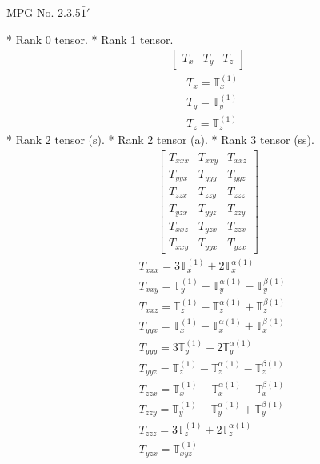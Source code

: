 \documentclass[fleqn,8pt,landscape]{jsarticle}
\begin{document}
\setcounter{MaxMatrixCols}{32}

\renewcommand{\tablename}{Table~}
\renewcommand{\figurename}{Figure~}
\begin{center}
\LARGE
MPG No. 2.3.5\quad$\bar{1}'$
\end{center}
* Rank 0 tensor.
* Rank 1 tensor.
\begin{align*}
\begin{bmatrix} T_{x} & T_{y} & T_{z} \end{bmatrix}
\end{align*}
\begin{align*}
& T_{x} = \mathbb{T}_{x}^{(1)} \\
& T_{y} = \mathbb{T}_{y}^{(1)} \\
& T_{z} = \mathbb{T}_{z}^{(1)}
\end{align*}
* Rank 2 tensor (s).
* Rank 2 tensor (a).
* Rank 3 tensor (ss).
\begin{align*}
\begin{bmatrix} T_{xxx} & T_{xxy} & T_{xxz} \\ T_{yyx} & T_{yyy} & T_{yyz} \\ T_{zzx} & T_{zzy} & T_{zzz} \\ T_{yzx} & T_{yyz} & T_{zzy} \\ T_{xxz} & T_{yzx} & T_{zzx} \\ T_{xxy} & T_{yyx} & T_{yzx} \end{bmatrix}
\end{align*}
\begin{align*}
& T_{xxx} = 3 \mathbb{T}_{x}^{(1)} + 2 \mathbb{T}_{x}^{\alpha(1)} \\
& T_{xxy} = \mathbb{T}_{y}^{(1)} - \mathbb{T}_{y}^{\alpha(1)} - \mathbb{T}_{y}^{\beta(1)} \\
& T_{xxz} = \mathbb{T}_{z}^{(1)} - \mathbb{T}_{z}^{\alpha(1)} + \mathbb{T}_{z}^{\beta(1)} \\
& T_{yyx} = \mathbb{T}_{x}^{(1)} - \mathbb{T}_{x}^{\alpha(1)} + \mathbb{T}_{x}^{\beta(1)} \\
& T_{yyy} = 3 \mathbb{T}_{y}^{(1)} + 2 \mathbb{T}_{y}^{\alpha(1)} \\
& T_{yyz} = \mathbb{T}_{z}^{(1)} - \mathbb{T}_{z}^{\alpha(1)} - \mathbb{T}_{z}^{\beta(1)} \\
& T_{zzx} = \mathbb{T}_{x}^{(1)} - \mathbb{T}_{x}^{\alpha(1)} - \mathbb{T}_{x}^{\beta(1)} \\
& T_{zzy} = \mathbb{T}_{y}^{(1)} - \mathbb{T}_{y}^{\alpha(1)} + \mathbb{T}_{y}^{\beta(1)} \\
& T_{zzz} = 3 \mathbb{T}_{z}^{(1)} + 2 \mathbb{T}_{z}^{\alpha(1)} \\
& T_{yzx} = \mathbb{T}_{xyz}^{(1)}
\end{align*}
\end{document}
